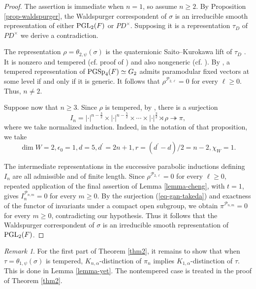 \documentclass[12pt]{amsart}
\theoremstyle{definition}
\theoremstyle{remark}
\newtheorem{remark}{Remark}
\begin{document}
\begin{proof}
The assertion is immediate when $n=1$, so assume $n\ge2$. By Proposition \ref{prop-waldspurger}, the Waldspurger correspondent of $\sigma$ is an irreducible smooth representation of either ${\rm PGL}_2(F)$ or $PD^\times$. Supposing it is a
representation $\tau_D$ of $PD^\times$ we derive a contradiction.

The representation
$\rho=\theta_{2,\psi}(\sigma)$
is the quaternionic Saito--Kurokawa lift of $\tau_D$ \cite[Proposition 5.8]{sch05}. It is nonzero and
tempered (cf. proof of \cite[Proposition 5.8]{sch05}) and also nongeneric (cf. \cite[Remark on p. 234]{sch05}). 
By \cite[Theorem~7.5.8]{rs07}, a tempered representation of
${\rm PGSp}_4(F)\simeq G_2$ admits paramodular fixed vectors at some level 
if and only if it is generic. It follows that 
$\rho^{\mathcal P_{2,\ell}}=0$ for every $\ell\geq 0$. Thus, $n \neq 2$.

Suppose now that $n \geq 3$. Since $\rho$ is tempered, by \cite[Proposition~3.2]{gt16}, there is
a surjection
\begin{equation}\label{eq-gan-takeda}
I_n =
|\cdot|^{n-\frac{3}{2}}\times
|\cdot|^{n-\frac{5}{2}}\times\cdots\times
|\cdot|^{\frac{3}{2}}\rtimes\rho
\twoheadrightarrow \pi,
\end{equation}
where we take normalized induction. Indeed, in the notation of
that proposition, we take
\[
\dim W=2, \epsilon_0=1,
d=5, d^\prime=2n+1, r=(d^\prime-d)/2 = n-2, \chi_W=1.
\]

The intermediate representations in the successive parabolic inductions defining $I_n$ are all admissible and of finite length. Since $\rho^{\mathcal P_{2,\ell}}=0$ for every $\ell\geq0$, repeated application of the final assertion of Lemma \ref{lemma-cheng}, with $t=1$, gives
$
I_n^{\mathcal P_{n,m}}=0$ for every $m\geq0$.
By the surjection (\ref{eq-gan-takeda}) and exactness of the functor of invariants under a compact open subgroup, we obtain
$
\pi^{\mathcal P_{n,m}}=0$ for every $m\geq0$,
contradicting our hypothesis. Thus it follows that the Waldspurger correspondent of $\sigma$ is an irreducible smooth representation of
${\rm PGL}_2(F)$.
\end{proof}

\begin{remark}\label{rmk-not-yet}
For the first part of Theorem \ref{thm2}, it remains to show that when $\tau=\theta_{1,\psi}(\sigma)$ is tempered, $K_{n,\alpha}$-distinction of $\pi_n$ implies $K_{1,\alpha}$-distinction of $\tau$. This is done in Lemma \ref{lemma-yet}. The nontempered case is treated in the proof of Theorem \ref{thm2}.
\end{remark}
\end{document}
